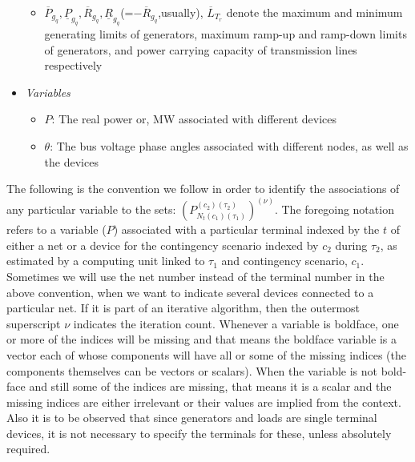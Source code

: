 \documentclass[preprint,12pt,3p]{elsarticle}
\begin{document}
\begin{itemize}
\begin{itemize}[label={}]
        \item $\overline{P}_{g_q},\underline{P}_{g_q}, \overline{R}_{g_q},\underline{R}_{g_q}$(=$-\overline{R}_{g_q}$,usually), $\overline{L}_{T_r}$ denote the maximum and minimum generating limits of generators, maximum ramp-up and ramp-down limits of generators, and power carrying capacity of transmission lines respectively
    \end{itemize}
    \item \textit{Variables}
    \begin{itemize}[label={}]
        \item $P$: The real power or, MW associated with different devices
        \item $\theta$: The bus voltage phase angles associated with different nodes, as well as the devices
    \end{itemize}
\end{itemize}
The following is the convention we follow in order to identify the associations of any particular variable to the sets: $(P_{{N}_{t}(c_1)(\tau_1)}^{(c_2)(\tau_2)})^{(\nu)}$. The foregoing notation refers to a variable ($P$) associated with a particular terminal indexed by the $t$ of either a net or a device for the contingency scenario indexed by $c_2$ during $\tau_2$, as estimated by a computing unit linked to $\tau_1$ and contingency scenario, $c_1$. Sometimes we will use the net number instead of the terminal number in the above convention, when we want to indicate several devices connected to a particular net. If it is part of an iterative algorithm, then the outermost superscript $\nu$ indicates the iteration count. Whenever a variable is boldface, one or more of the indices will be missing and that means the boldface variable is a vector each of whose components will have all or some of the missing indices (the components themselves can be vectors or scalars). When the variable is not bold-face and still some of the indices are missing, that means it is a scalar and the missing indices are either irrelevant or their values are implied from the context. Also it is to be observed that since generators and loads are single terminal devices, it is not necessary to specify the terminals for these, unless absolutely required.
\iffalse
\end{document}
